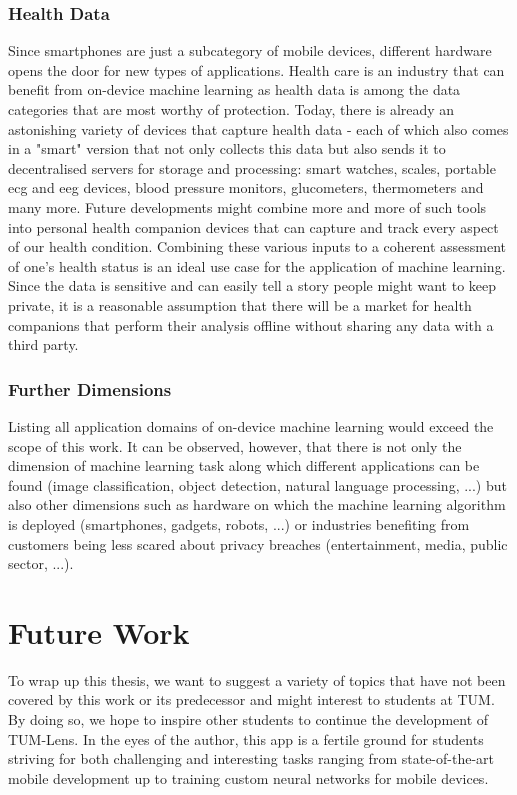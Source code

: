 \documentclass[
			   fontsize=11pt,
               paper=a4,
               bibliography=totoc,
               idxtotoc,
               headsepline,
               footsepline,
               footinclude=false,
               BCOR=12mm,
               DIV=13,
               openany,   %
               oneside    %
               ]
               {scrbook}
\begin{document}
\subsubsection{Health Data}
Since smartphones are just a subcategory of mobile devices, different hardware opens the door for new types of applications. Health care is an industry that can benefit from on-device machine learning as health data is among the data categories that are most worthy of protection. Today, there is already an astonishing variety of devices that capture health data - each of which also comes in a "smart" version that not only collects this data but also sends it to decentralised servers for storage and processing: smart watches, scales, portable \gls{ecg} and \gls{eeg} devices, blood pressure monitors, glucometers, thermometers and many more. Future developments might combine more and more of such tools into personal health companion devices that can capture and track every aspect of our health condition. Combining these various inputs to a coherent assessment of one's health status is an ideal use case for the application of machine learning. Since the data is sensitive and can easily tell a story people might want to keep private, it is a reasonable assumption that there will be a market for health companions that perform their analysis offline without sharing any data with a third party.

\subsubsection{Further Dimensions}
Listing all application domains of on-device machine learning would exceed the scope of this work. It can be observed, however, that there is not only the dimension of machine learning task along which different applications can be found (image classification, object detection, natural language processing, ...) but also other dimensions such as hardware on which the machine learning algorithm is deployed (smartphones, gadgets, robots, ...) or industries benefiting from customers being less scared about privacy breaches (entertainment, media, public sector, ...).

\section{Future Work}

To wrap up this thesis, we want to suggest a variety of topics that have not been covered by this work or its predecessor and might interest to students at TUM. By doing so, we hope to inspire other students to continue the development of TUM-Lens. In the eyes of the author, this app is a fertile ground for students striving for both challenging and interesting tasks ranging from state-of-the-art mobile development up to training custom neural networks for mobile devices.
\end{document}
